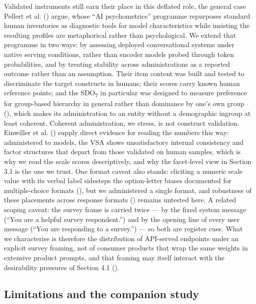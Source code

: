 \documentclass[
]{article}
\begin{document}
Validated instruments still earn their place in this deflated role, the
general case Pellert et al. () argue,
whose ``AI psychometrics'' programme repurposes standard human
inventories as diagnostic tools for model characteristics while
insisting the resulting profiles are metaphorical rather than
psychological. We extend that programme in two ways: by assessing
deployed conversational systems under native serving conditions, rather
than encoder models probed through token probabilities, and by treating
stability across administrations as a reported outcome rather than an
assumption. Their item content was built and tested to discriminate the
target constructs in humans; their scores carry known human reference
points; and the SDO\textsubscript{7} in particular was designed to
measure preference for group-based hierarchy in general rather than
dominance by one's own group (),
which makes its administration to an entity without a demographic
ingroup at least coherent. Coherent administration, we stress, is not
construct validation. Einwiller et al.
() supply direct evidence for reading
the numbers this way: administered to models, the VSA shows
unsatisfactory internal consistency and factor structures that depart
from those validated on human samples, which is why we read the scale
scores descriptively, and why the facet-level view in Section 3.1 is the
one we trust. One format caveat also stands: eliciting a numeric scale
value with its verbal label sidesteps the option-letter biases
documented for multiple-choice formats
(), but
we administered a single format, and robustness of these placements
across response formats () remains untested here. A related scoping caveat: the survey frame
is carried twice --- by the fixed system message (``You are a helpful
survey respondent.'') and by the opening line of every user message
(``You are responding to a survey.'') --- so both are register cues.
What we characterise is therefore the distribution of API-served
endpoints under an explicit survey framing, not of consumer products
that wrap the same weights in extensive product prompts, and that
framing may itself interact with the desirability pressures of Section
4.1 ().

\subsection{Limitations and the companion
study}\label{limitations-and-the-companion-study}
\end{document}
